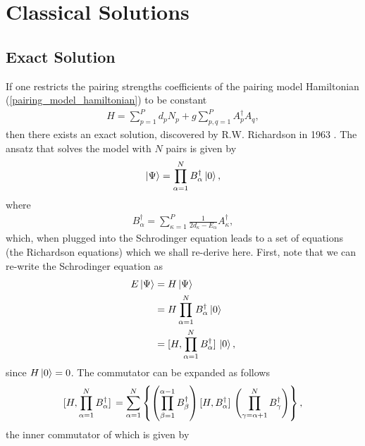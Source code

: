 \documentclass[10pt]{article}
\begin{document}
\section{Classical Solutions}

\subsection{Exact Solution}

If one restricts the pairing strengths coefficients of the pairing model Hamiltonian (\ref{pairing_model_hamiltonian}) to be constant
\begin{align}
\label{pairing_model_hamiltonian_constant_g}
H=\sum_{p=1}^Pd_pN_p+g\sum_{p,q=1}^PA^\dagger_pA_q,
\end{align}
then there exists an exact solution, discovered by R.W. Richardson in 1963 \cite{ref:rich1}. The ansatz that solves the model with $N$ pairs is given by
\begin{align}
\label{richardson_ansatz}
\ket{\Psi}=\prod_{\alpha=1}^N B^\dagger_{\alpha}\ket{0},
\end{align}
where
\begin{align}
B^\dagger_\alpha=\sum_{\kappa=1}^P\frac{1}{2d_\kappa-E_\alpha}A^\dagger_\kappa,
\end{align}
which, when plugged into the Schrodinger equation leads to a set of equations (the Richardson equations) which we shall re-derive \cite{ref:rich_der} here. First, note that we can re-write the Schrodinger equation as
\begin{align}
\label{richardson_shcrodinger}
E\ket{\Psi}
&=
H\ket{\Psi}
\nonumber
\\
&=
H\prod_{\alpha=1}^NB^\dagger_{\alpha}\ket{0}
\nonumber
\\
&=
\comm*{H}{\prod_{\alpha=1}^NB^\dagger_{\alpha}}\ket{0},
\end{align}
since $H\ket{0}=0$. The commutator can be expanded as follows
\begin{align}
\label{expanded_commutator_HBd}
\comm*{H}{\prod_{\alpha=1}^N B^\dagger_{\alpha}}
=
\sum_{\alpha=1}^N
\left\{
\left(\prod_{\beta=1}^{\alpha-1}B^\dagger_\beta\right)
\comm*{H}{B^\dagger_\alpha}
\left(\prod_{\gamma=\alpha+1}^NB^\dagger_\gamma\right)
\right\},
\end{align}
the inner commutator of which is given by
\end{document}
